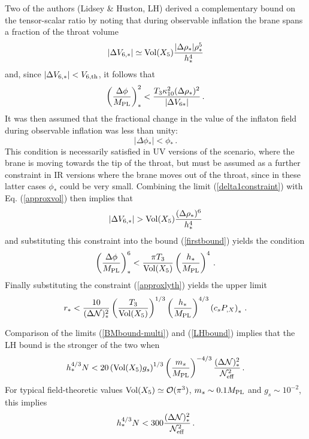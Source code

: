 Two of the authors (Lidsey \& Huston, LH) derived a complementary bound on the 
tensor-scalar ratio by noting that during observable inflation
the brane spans a fraction of the throat volume \cite{lidseyhuston}
\begin{equation}
\label{approxvol}
| \Delta V_{6,*} | \simeq \mathrm{Vol} (X_5) \frac{| \Delta \rho_*| \rho_*^5}{h_*^4}
\end{equation}
and, since $| \Delta V_{6,*} |< 
V_{6,{\rm th}}$, it follows that 
\begin{equation}
\label{firstbound}
\left(\frac{\Delta \phi}{M_{\mathrm{PL}}}\right)^2_* < \frac{T_3 \kappa_{10}^2
(\Delta \rho_*)^2}{| \Delta V_{6*}|} \,.
\end{equation}
It was then assumed that the fractional change in the value of the 
inflaton field during observable inflation was less than unity:
\begin{equation}
\label{delta1constraint}
|\Delta \phi_* | <  \phi_* \,.
\end{equation} 
This condition is necessarily satisfied in UV
versions of the scenario, 
where the brane is moving towards the tip of the throat, but must be 
assumed as a further constraint in IR versions 
where the brane moves out of the throat, since in these latter cases
$\phi_*$ could be very small. Combining the limit 
(\ref{delta1constraint}) with Eq. (\ref{approxvol}) then implies that 
\begin{equation}
| \Delta V_{6,*} | > \mathrm{Vol} (X_5) \frac{( \Delta \rho_* )^6}{h_*^4}
\end{equation}
and substituting this constraint into the bound (\ref{firstbound}) yields 
the condition 
\begin{equation}
\left( \frac{\Delta \phi}{M_{\mathrm{PL}}} \right)_*^6 < \frac{\pi T_3}{\mathrm{Vol} (X_5)} 
\left( \frac{h_*}{M_{\mathrm{PL}}} \right)^4 \,.
\end{equation}
Finally substituting the constraint (\ref{approxlyth}) 
yields the upper limit \cite{lidseyhuston}
\begin{equation}
\label{LHbound}
r_* < \frac{10}{(\Delta {\cal{N}})_*^2} \left( \frac{T_3}{\mathrm{Vol} (X_5)} \right)^{1/3} 
\left( \frac{h_*}{M_{\mathrm{PL}}} \right)^{4/3} \left( c_s P_{,X} \right)_* \,.
\end{equation}

Comparison of the limits (\ref{BMbound-multi}) and (\ref{LHbound})
implies that the LH bound is the stronger of the two when
\begin{equation}
\label{LHstronger}
h_*^{4/3}N < 20 \left( \mathrm{Vol} (X_5) g_s \right)^{1/3}  
\left( \frac{m_s}{M_{\mathrm{PL}}} \right)^{-4/3} 
\frac{( \Delta {\cal{N}} )_*^2}{{\cal{N}}^2_{\rm eff}} \,.
\end{equation}
For typical field-theoretic values $\mathrm{Vol} (X_5) \simeq \mathcal{O}(\pi^3)$, $m_s \sim
0.1 M_{\mathrm{PL}}$ 
and  $g_s \sim 10^{-2}$, this implies 
\begin{equation}
\label{LHstronger1}
h_*^{4/3} N < 300 \frac{(\Delta {\cal{N}})^2_*}{{\cal{N}}_{\rm eff}^2} \,.
\end{equation}

